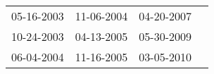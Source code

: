\begin{supertabular}{llll}
 05-16-2003 &  11-06-2004 &  04-20-2007 \\
 10-24-2003 &  04-13-2005 &  05-30-2009 \\
 06-04-2004 &  11-16-2005 &  03-05-2010 \\
\end{supertabular}
